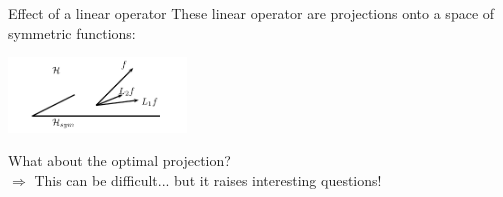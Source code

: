 \documentclass{beamer}
\begin{document}
\begin{frame}{Effect of a linear operator}
These linear operator are projections onto a space of symmetric functions:
\begin{center}
\vspace{0.5cm}
 \includegraphics[height=2cm]{figures/proj-sym}
\vspace{0.5cm}
\end{center}
What about the optimal projection?\\
\vspace{0.5cm}
\alert{$\Rightarrow$ This can be difficult... but it raises interesting questions!}
\end{frame}

\end{document}
